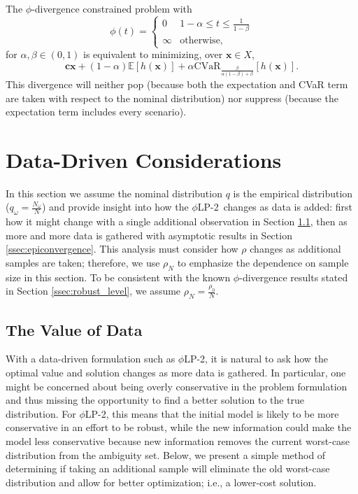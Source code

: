 \documentclass[ijoc,letterpaper]{informs3} %
\newcommand{\E}{\mathbb{E}}
\newcommand{\e}[1]{\E \left[ #1 \right]}
\newcommand{\x}{\mathbf{x}}
\renewcommand{\c}{\mathbf{c}}
\newcommand{\plp}{$\phi$LP-2}
\begin{document}
\begin{example}
	The $\phi$-divergence constrained problem with
	\[
		\phi(t) = 
		\begin{cases}
			0 & 1-\alpha \leq t \leq \frac{1}{1-\beta} \\
			\infty & \text{otherwise},
		\end{cases}
	\]
	for $\alpha,\beta \in (0,1)$ is equivalent to minimizing, over $\x \in X$,
	\[
		\c\x + (1-\alpha)\e{h(\x)} + \alpha \mbox{CVaR}_{\frac{\beta}{\alpha(1-\beta)+\beta}}[h(\x)].
	\]
	This divergence will neither pop (because both the expectation and CVaR term are taken with respect to the nominal distribution) nor suppress (because the expectation term includes every scenario).
\end{example}

\section{Data-Driven Considerations}
\label{sec:properties}

In this section we assume the nominal distribution $q$ is the empirical distribution ($q_\omega = \tfrac{N_\omega}{N}$) and provide insight into how the \plp\ changes as data is added: first how it might change with a single additional observation in Section \ref{ssec:value}, then as more and more data is gathered with asymptotic results in Section \ref{ssec:epiconvergence}.
This analysis must consider how $\rho$ changes as additional samples are taken; therefore, we use $\rho_N$ to emphasize the dependence on sample size in this section.
To be consistent with the known $\phi$-divergence results stated in Section \ref{ssec:robust_level}, we assume $\rho_N = \frac{\rho_0}{N}$.

\subsection{The Value of Data} \label{ssec:value}

With a data-driven formulation such as \plp, it is natural to ask how the optimal value and solution changes as more data is gathered.
In particular, %
one might be concerned about being overly conservative in the problem formulation and thus missing the opportunity to find a better solution to the true distribution.
For \plp, this means that the initial model is likely to be more conservative in an effort to be robust, while the new information could make the model less conservative because new information removes the current worst-case distribution from the ambiguity set.  
Below, we present a simple method of determining if taking an additional sample will eliminate the old worst-case distribution and allow for better optimization; i.e., a lower-cost solution.
\end{document}
